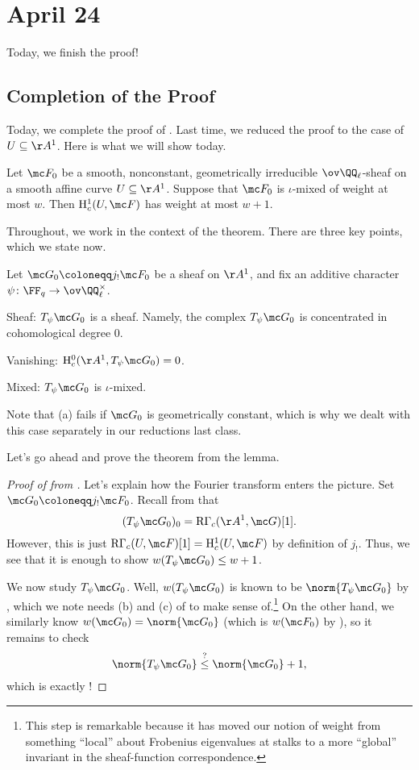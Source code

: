 \documentclass[../notes.tex]{subfiles}
\begin{document}
\section{April 24}
Today, we finish the proof!

\subsection{Completion of the Proof}
Today, we complete the proof of . Last time, we reduced the proof to the case of $U\subseteq\AA^1$. Here is what we will show today.
\begin{theorem} \label{thm:reduced-weil-ii}
	Let $\mc F_0$ be a smooth, nonconstant, geometrically irreducible $\ov\QQ_\ell$-sheaf on a smooth affine curve $U\subseteq\AA^1$. Suppose that $\mc F_0$ is $\iota$-mixed of weight at most $w$. Then $\mathrm H^1_c(U,\mc F)$ has weight at most $w+1$.
\end{theorem}
Throughout, we work in the context of the theorem. There are three key points, which we state now.
\begin{lemma} \label{lem:key-weil-ii}
	Let $\mc G_0\coloneqq j_!\mc F_0$ be a sheaf on $\AA^1$, and fix an additive character $\psi\colon\FF_q\to\ov\QQ_\ell^\times$.
	\begin{listalph}
		\item Sheaf: $T_\psi\mc G_0$ is a sheaf. Namely, the complex $T_\psi\mc G_0$ is concentrated in cohomological degree $0$.
		\item Vanishing: $\mathrm H^0_c(\AA^1,T_\psi\mc G_0)=0$.
		\item Mixed: $T_\psi\mc G_0$ is $\iota$-mixed.
	\end{listalph}
\end{lemma}
\begin{remark}
	Note that (a) fails if $\mc G_0$ is geometrically constant, which is why we dealt with this case separately in our reductions last class.
\end{remark}
Let's go ahead and prove the theorem from the lemma.
\begin{proof}[Proof of  from ]
	Let's explain how the Fourier transform enters the picture. Set $\mc G_0\coloneqq j_!\mc F_0$. Recall from  that
	\[(T_\psi\mc G_0)_0=\mathrm R\Gamma_c(\AA^1,\mc G)[1].\]
	However, this is just $\mathrm R\Gamma_c(U,\mc F)[1]=\mathrm H^1_c(U,\mc F)$ by definition of $j_!$. Thus, we see that it is enough to show $w(T_\psi\mc G_0)\le w+1$.

	We now study $T_\psi\mc G_0$. Well, $w(T_\psi\mc G_0)$ is known to be $\norm{T_\psi\mc G_0}$ by , which we note needs (b) and (c) of  to make sense of.\footnote{This step is remarkable because it has moved our notion of weight from something ``local'' about Frobenius eigenvalues at stalks to a more ``global'' invariant in the sheaf-function correspondence.} On the other hand, we similarly know $w(\mc G_0)=\norm{\mc G_0}$ (which is $w(\mc F_0)$ by ), so it remains to check
	\[\norm{T_\psi\mc G_0}\stackrel?\le\norm{\mc G_0}+1,\]
	which is exactly !
\end{proof}
\end{document}
